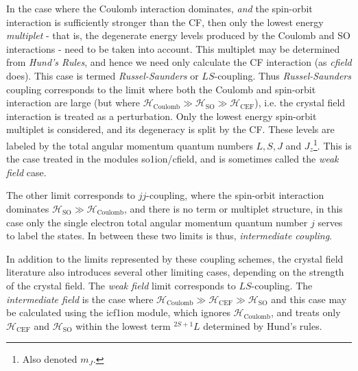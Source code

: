 In the case where the Coulomb interaction dominates, \emph{and} the
spin-orbit interaction is sufficiently stronger than the CF, then only the lowest
energy \emph{multiplet} - that is, the degenerate energy levels produced by the Coulomb and SO
interactions - need to be taken into account. This multiplet may be determined from \emph{Hund's
Rules}, and hence we need only calculate the CF interaction (as \emph{cfield} does). This case is
termed \emph{Russel-Saunders} or $LS$-coupling. 
Thus  \emph{Russel-Saunders} coupling corresponds to the limit where
both the Coulomb and spin-orbit interaction are large (but where $\mathcal{H}_{\mathrm{Coulomb}}\gg
\mathcal{H}_{\mathrm{SO}}\gg
\mathcal{H}_{\mathrm{CEF}}$), i.e. the crystal field interaction is treated as a perturbation. Only
the lowest energy spin-orbit multiplet is considered, and its degeneracy is split by the CF. These
levels are labeled by the total angular momentum quantum numbers $L, S, J$ and $J_z$\footnote{Also
denoted $m_J$.}. This is the case treated in the modules {\prg so1ion}/{\prg cfield}, and is 
sometimes called the \emph{weak field} case.

The other limit corresponds to $jj$-coupling, where the spin-orbit interaction
dominates $\mathcal{H}_{\mathrm{SO}}\gg
\mathcal{H}_{\mathrm{Coulomb}}$, and there is no term or multiplet structure, 
in this case only the single electron total
angular momentum quantum number $j$ serves to label the states. 
In between these two limits is thus, \emph{intermediate coupling}. 

In addition to the limits represented by these coupling schemes, the crystal field literature
also introduces several other limiting cases, depending on the strength of the crystal
field. The \emph{weak field} limit corresponds to $LS$-coupling. The \emph{intermediate field} is
the case where $\mathcal{H}_{\mathrm{Coulomb}}\gg\mathcal{H}_{\mathrm{CEF}}\gg
\mathcal{H}_{\mathrm{SO}}$ and this case may be calculated using the {\prg icf1ion} module,
which ignores $\mathcal{H}_{\mathrm{Coulomb}}$, and treats only $\mathcal{H}_{\mathrm{CEF}}$ and
$\mathcal{H}_{\mathrm{SO}}$ within the lowest term $^{2S+1} L$ determined by Hund's rules.

